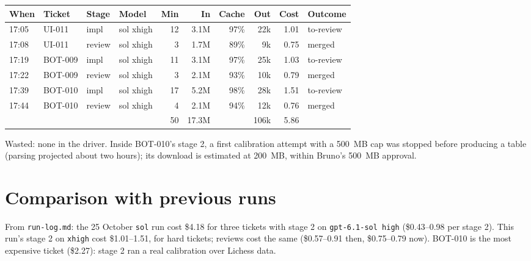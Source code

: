 \documentclass[11pt,a4paper]{article}
\begin{document}
{\small
\begin{tabularx}{\linewidth}{@{}llllrrrrrX@{}}
\toprule
When & Ticket & Stage & Model & Min & In & Cache & Out & Cost & Outcome \\
\midrule
17:05 & UI-011 & impl & sol xhigh & 12 & 3.1M & 97\% & 22k & 1.01 & to-review \\
17:08 & UI-011 & review & sol xhigh & 3 & 1.7M & 89\% & 9k & 0.75 & merged \\
17:19 & BOT-009 & impl & sol xhigh & 11 & 3.1M & 97\% & 25k & 1.03 & to-review \\
17:22 & BOT-009 & review & sol xhigh & 3 & 2.1M & 93\% & 10k & 0.79 & merged \\
17:39 & BOT-010 & impl & sol xhigh & 17 & 5.2M & 98\% & 28k & 1.51 & to-review \\
17:44 & BOT-010 & review & sol xhigh & 4 & 2.1M & 94\% & 12k & 0.76 & merged \\
\midrule
 & & & & 50 & 17.3M & & 106k & 5.86 & \\
\bottomrule
\end{tabularx}
}

\begin{center}
\end{center}

Wasted: none in the driver. Inside BOT-010's stage 2, a first calibration attempt with a 500~MB
cap was stopped before producing a table (parsing projected about two hours); its download is
estimated at 200~MB, within Bruno's 500~MB approval.

\section*{Comparison with previous runs}

From \texttt{run-log.md}: the 25 October \texttt{sol} run cost \$4.18 for three tickets with stage
2 on \texttt{gpt-6.1-sol high} (\$0.43--0.98 per stage 2). This run's stage 2 on \texttt{xhigh}
cost \$1.01--1.51, for hard tickets; reviews cost the same (\$0.57--0.91 then, \$0.75--0.79 now).
BOT-010 is the most expensive ticket (\$2.27): stage 2 ran a real calibration over Lichess data.
\end{document}
